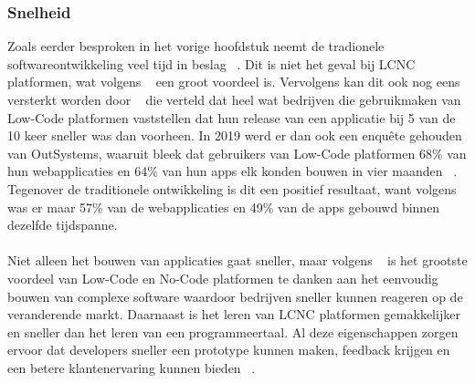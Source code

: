 \subsubsection{Snelheid}
\label{subsec:snelheid}
Zoals eerder besproken in het vorige hoofdstuk neemt de tradionele softwareontwikkeling veel tijd in beslag ~\autocite{Moskal_2021}. Dit is niet het geval 
bij LCNC platformen, wat volgens ~\textcite{Adrian_2020} een groot voordeel is. Vervolgens kan dit ook nog eens versterkt worden door ~\textcite{Yan2021}
die verteld dat heel wat bedrijven die gebruikmaken van Low-Code platformen vaststellen dat hun release van een applicatie bij 5 van de 10 keer sneller was dan voorheen.
In 2019 werd er dan ook een enquête gehouden van OutSystems, waaruit bleek dat gebruikers van Low-Code platformen 68\% van hun webapplicaties en 64\% van hun apps elk konden
bouwen in vier maanden ~\autocite{Yan2021}. Tegenover de traditionele ontwikkeling is dit een positief resultaat, want volgens ~\textcite{Yan2021}
was er maar 57\% van de webapplicaties en 49\% van de apps gebouwd binnen dezelfde tijdspanne.
\\
\\
Niet alleen het bouwen van applicaties gaat sneller, maar volgens ~\textcite{da_Cruz_2021} is het grootste voordeel
van Low-Code en No-Code platformen te danken aan het eenvoudig bouwen van complexe software waardoor bedrijven
sneller kunnen reageren op de veranderende markt. Daarnaast is het leren van LCNC platformen gemakkelijker en sneller dan het leren van 
een programmeertaal. Al deze eigenschappen zorgen ervoor dat developers sneller een prototype kunnen maken, feedback krijgen en een betere
klantenervaring kunnen bieden ~\autocite{da_Cruz_2021}.

